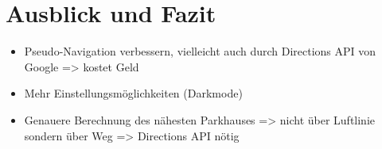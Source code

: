 \chapter{Ausblick und Fazit}
\label{chap:7}

\begin{itemize}
	\item Pseudo-Navigation verbessern, vielleicht auch durch Directions API von Google => kostet Geld
	\item Mehr Einstellungsmöglichkeiten (Darkmode)
	\item Genauere Berechnung des nähesten Parkhauses => nicht über Luftlinie sondern über Weg => Directions API nötig
\end{itemize}